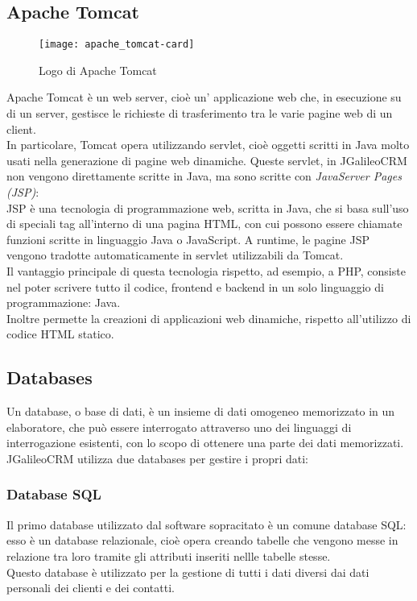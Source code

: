 \subsection{Apache Tomcat}
\begin{figure}[h]
	\centering
	\texttt{[image: apache\_tomcat-card]}
	\caption{Logo di Apache Tomcat}
\end{figure}
Apache Tomcat è un web server, cioè un' applicazione web che, in esecuzione su di un server, gestisce le richieste di trasferimento tra le varie pagine web di un client.\\
In particolare, Tomcat opera utilizzando servlet, cioè oggetti scritti in Java molto usati nella generazione di pagine web dinamiche.
Queste servlet, in JGalileoCRM non vengono direttamente scritte in Java, ma sono scritte con \emph{JavaServer Pages (JSP)}:\\
JSP è una tecnologia di programmazione web, scritta in Java, che si basa sull'uso di speciali tag all'interno di una pagina HTML, con cui possono essere chiamate funzioni scritte in linguaggio Java o JavaScript.
A runtime, le pagine JSP vengono tradotte automaticamente in servlet utilizzabili da Tomcat. \\
Il vantaggio principale di questa tecnologia rispetto, ad esempio, a \gls{PHP}, consiste nel poter scrivere tutto il codice, frontend e backend in un solo linguaggio di programmazione: Java. \\
Inoltre permette la creazioni di applicazioni web dinamiche, rispetto all'utilizzo di codice HTML statico.
\subsection{Databases}
Un database, o base di dati, è un insieme di dati omogeneo memorizzato in un elaboratore, che può essere interrogato attraverso uno dei linguaggi di interrogazione esistenti, con lo scopo di ottenere una parte dei dati memorizzati.
JGalileoCRM utilizza due databases per gestire i propri dati:
\subsubsection{Database SQL}
Il primo database utilizzato dal software sopracitato è un comune database \gls{SQL}: esso è un database relazionale, cioè opera creando tabelle che vengono messe in relazione tra loro tramite gli attributi inseriti nellle tabelle stesse.\\
Questo database è utilizzato per la gestione di tutti i dati diversi dai dati personali dei clienti e dei contatti. %
